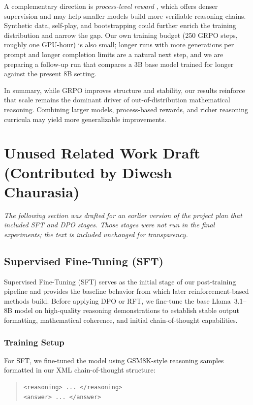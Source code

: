 \documentclass{article}
\begin{document}
A complementary direction is \emph{process-level reward} \cite{lightman2023verify}, which offers denser supervision and may help smaller models build more verifiable reasoning chains. Synthetic data, self-play, and bootstrapping \cite{deepseekr1, r1zero2025, kojima2022zeroshot} could further enrich the training distribution and narrow the gap. Our own training budget (250 GRPO steps, roughly one GPU-hour) is also small; longer runs with more generations per prompt and longer completion limits are a natural next step, and we are preparing a follow-up run that compares a 3B base model trained for longer against the present 8B setting.

In summary, while GRPO improves structure and stability, our results reinforce that scale remains the dominant driver of out-of-distribution mathematical reasoning. Combining larger models, process-based rewards, and richer reasoning curricula may yield more generalizable improvements.




\appendix
\section{Unused Related Work Draft (Contributed by Diwesh Chaurasia)}

\emph{The following section was drafted for an earlier version of the project plan that included SFT and DPO stages. Those stages were not run in the final experiments; the text is included unchanged for transparency.}

\subsection{Supervised Fine-Tuning (SFT)}

Supervised Fine-Tuning (SFT) serves as the initial stage of our post-training pipeline and provides the baseline behavior from which later reinforcement-based methods build. Before applying DPO or RFT, we fine-tune the base Llama~3.1--8B model on high-quality reasoning demonstrations to establish stable output formatting, mathematical coherence, and initial chain-of-thought capabilities.

\subsubsection*{Training Setup}

For SFT, we fine-tuned the model using GSM8K-style reasoning samples formatted in our XML chain-of-thought structure:
\begin{quote}
\texttt{<reasoning> ... </reasoning>} \\
\texttt{<answer> ... </answer>}
\end{quote}
\end{document}
